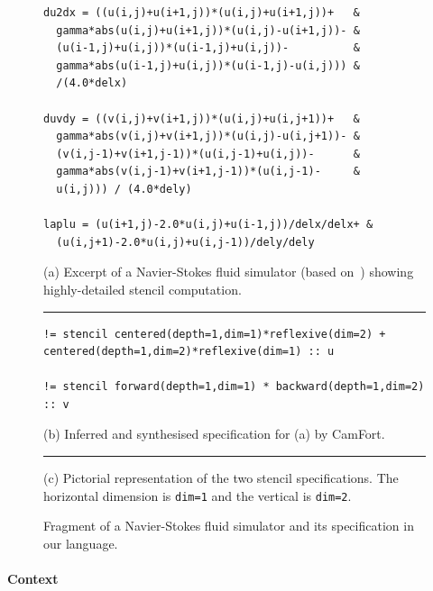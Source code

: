 \documentclass[9pt]{sigplanconf}
\theoremstyle{definition}
\begin{document}
\begin{figure}[t]
\begin{verbatim}
du2dx = ((u(i,j)+u(i+1,j))*(u(i,j)+u(i+1,j))+   &
  gamma*abs(u(i,j)+u(i+1,j))*(u(i,j)-u(i+1,j))- &
  (u(i-1,j)+u(i,j))*(u(i-1,j)+u(i,j))-          &
  gamma*abs(u(i-1,j)+u(i,j))*(u(i-1,j)-u(i,j))) &
  /(4.0*delx)

duvdy = ((v(i,j)+v(i+1,j))*(u(i,j)+u(i,j+1))+   &
  gamma*abs(v(i,j)+v(i+1,j))*(u(i,j)-u(i,j+1))- &
  (v(i,j-1)+v(i+1,j-1))*(u(i,j-1)+u(i,j))-      &
  gamma*abs(v(i,j-1)+v(i+1,j-1))*(u(i,j-1)-     & 
  u(i,j))) / (4.0*dely)

laplu = (u(i+1,j)-2.0*u(i,j)+u(i-1,j))/delx/delx+ &
  (u(i,j+1)-2.0*u(i,j)+u(i,j-1))/dely/dely
\end{verbatim}
(a) Excerpt of a Navier-Stokes fluid simulator
(based on~\citet{griebel1997numerical}) showing highly-detailed stencil computation.
\vspace{0.5em}
\hrule
%
\begin{verbatim}
!= stencil centered(depth=1,dim=1)*reflexive(dim=2) + centered(depth=1,dim=2)*reflexive(dim=1) :: u

!= stencil forward(depth=1,dim=1) * backward(depth=1,dim=2) :: v
\end{verbatim}
(b) Inferred and synthesised specification for (a) by CamFort.
\vspace{0.5em}
\hrule
%
\begin{center}
\end{center}
\vspace{-0.5em}
(c) Pictorial representation of the two stencil specifications.
The horizontal dimension is \texttt{dim=1} and the vertical is \texttt{dim=2}.
\caption{Fragment of a Navier-Stokes fluid simulator and its
  specification in our language.}
\label{ref:navier-stokes-fragment}
\vspace{-0.8em}
\end{figure}

\paragraph{Context}
\end{document}
